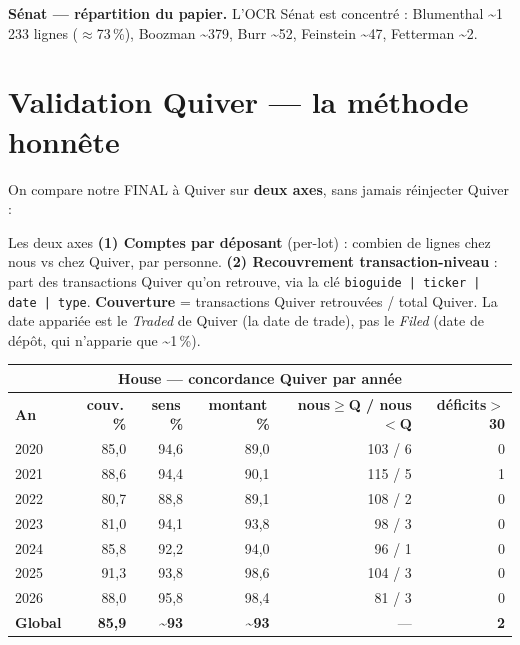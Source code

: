 \documentclass[11pt,a4paper]{article}
\newcommand{\code}[1]{\texttt{\small #1}}
\begin{document}
\textbf{Sénat --- répartition du papier.} L'OCR Sénat est concentré : Blumenthal \textasciitilde 1\,233
lignes ($\approx$73\,\%), Boozman \textasciitilde 379, Burr \textasciitilde 52, Feinstein
\textasciitilde 47, Fetterman \textasciitilde 2.

\section{Validation Quiver --- la méthode honnête}

On compare notre FINAL à Quiver sur \textbf{deux axes}, sans jamais réinjecter Quiver :

\begin{defbox}{Les deux axes}
\textbf{(1) Comptes par déposant} (per-lot) : combien de lignes chez nous vs chez Quiver, par personne.
\textbf{(2) Recouvrement transaction-niveau} : part des transactions Quiver qu'on retrouve, via la clé
\code{bioguide | ticker | date | type}. \textbf{Couverture} = transactions Quiver retrouvées / total
Quiver. La date appariée est le \emph{Traded} de Quiver (la date de trade), pas le \emph{Filed} (date de
dépôt, qui n'apparie que \textasciitilde 1\,\%).
\end{defbox}

\begin{center}\small
\begin{tabular}{@{}lrrrrr@{}}
\multicolumn{6}{c}{\textbf{House --- concordance Quiver par année}}\\
\toprule
\textbf{An} & \textbf{couv.\,\%} & \textbf{sens\,\%} & \textbf{montant\,\%} & \textbf{nous$\geq$Q / nous$<$Q} & \textbf{déficits$>$30}\\
\midrule
2020 & 85,0 & 94,6 & 89,0 & 103 / 6 & 0 \\
2021 & 88,6 & 94,4 & 90,1 & 115 / 5 & 1 \\
2022 & 80,7 & 88,8 & 89,1 & 108 / 2 & 0 \\
2023 & 81,0 & 94,1 & 93,8 & 98 / 3 & 0 \\
2024 & 85,8 & 92,2 & 94,0 & 96 / 1 & 0 \\
2025 & 91,3 & 93,8 & 98,6 & 104 / 3 & 0 \\
2026 & 88,0 & 95,8 & 98,4 & 81 / 3 & 0 \\
\midrule
\textbf{Global} & \textbf{85,9} & \textbf{\textasciitilde 93} & \textbf{\textasciitilde 93} & --- & \textbf{2}\\
\bottomrule
\end{tabular}
\end{center}
\end{document}
